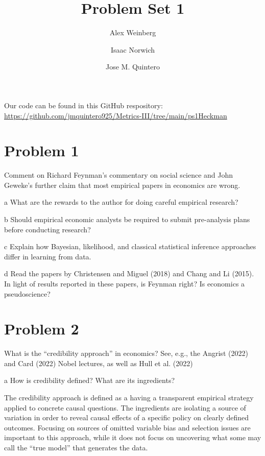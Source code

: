 \documentclass{article}
\title{Problem Set 1}
\author{Alex Weinberg \and Isaac Norwich \and Jose M. Quintero}
\begin{document}
\maketitle

Our code can be found in this GitHub respository: \url{https://github.com/jmquintero925/Metrics-III/tree/main/ps1Heckman}


\section*{Problem 1}
Comment on Richard Feynman’s commentary on social science and John Geweke’s further claim that most empirical papers in economics are wrong.
\begin{problem}{a}
What are the rewards to the author for doing careful empirical research?
\end{problem}
\begin{problem}{b}
Should empirical economic analysts be required to submit pre-analysis
plans before conducting research?
\end{problem}
\begin{problem}{c}
Explain how Bayesian, likelihood, and classical statistical inference approaches differ in learning from data.
\end{problem}
\begin{problem}{d}
 Read the papers by Christensen and Miguel (2018) and Chang and Li (2015). In light of results reported in these papers, is Feynman right? Is economics a pseudoscience?
\end{problem}


\newpage
\section*{Problem 2}
What is the “credibility approach” in economics? See, e.g., the Angrist
(2022) and Card (2022) Nobel lectures, as well as Hull et al. (2022)
\begin{problem}{a}
How is credibility defined? What are its ingredients?
\end{problem}

The credibility approach is defined as a having a transparent empirical strategy applied to concrete causal questions. The ingredients are isolating a source of variation in order to reveal causal effects of a specific policy on clearly defined outcomes. Focusing on sources of omitted variable bias and selection issues are important to this approach, while it does not focus on uncovering what some may call the ``true model'' that generates the data. 
\end{document}
